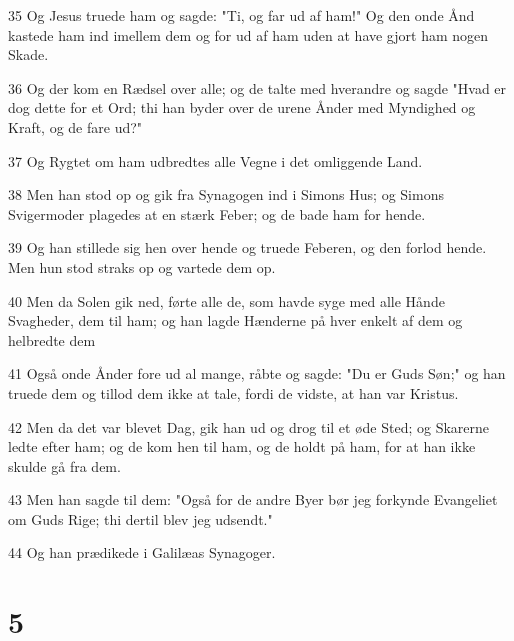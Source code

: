 \par 35 Og Jesus truede ham og sagde: "Ti, og far ud af ham!" Og den onde Ånd kastede ham ind imellem dem og for ud af ham uden at have gjort ham nogen Skade.
\par 36 Og der kom en Rædsel over alle; og de talte med hverandre og sagde "Hvad er dog dette for et Ord; thi han byder over de urene Ånder med Myndighed og Kraft, og de fare ud?"
\par 37 Og Rygtet om ham udbredtes alle Vegne i det omliggende Land.
\par 38 Men han stod op og gik fra Synagogen ind i Simons Hus; og Simons Svigermoder plagedes at en stærk Feber; og de bade ham for hende.
\par 39 Og han stillede sig hen over hende og truede Feberen, og den forlod hende. Men hun stod straks op og vartede dem op.
\par 40 Men da Solen gik ned, førte alle de, som havde syge med alle Hånde Svagheder, dem til ham; og han lagde Hænderne på hver enkelt af dem og helbredte dem
\par 41 Også onde Ånder fore ud al mange, råbte og sagde: "Du er Guds Søn;" og han truede dem og tillod dem ikke at tale, fordi de vidste, at han var Kristus.
\par 42 Men da det var blevet Dag, gik han ud og drog til et øde Sted; og Skarerne ledte efter ham; og de kom hen til ham, og de holdt på ham, for at han ikke skulde gå fra dem.
\par 43 Men han sagde til dem: "Også for de andre Byer bør jeg forkynde Evangeliet om Guds Rige; thi dertil blev jeg udsendt."
\par 44 Og han prædikede i Galilæas Synagoger.

\chapter{5}

